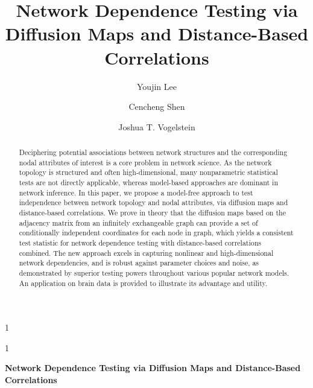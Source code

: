 \documentclass[12pt]{article}
\theoremstyle{definition}
\newcommand{\blind}{1}
\begin{document}
	
	\def\spacingset#1{\renewcommand{\baselinestretch}%
		{#1}\small\normalsize} \spacingset{1}
	
	\title{\bf Network Dependence Testing via Diffusion Maps and Distance-Based Correlations}
	\blind
	{\author[1]{Youjin Lee} %
		\author[2]{Cencheng Shen} %
		\author[2,3,4]{Joshua T. Vogelstein}
		\date{}
		\maketitle
	} \fi
	
	\blind
	{
		\bigskip
		\bigskip
		\bigskip
		\begin{center}
			{\LARGE\bf Network Dependence Testing via Diffusion Maps and Distance-Based Correlations}
		\end{center}
		\medskip
	} \fi
	
	\begin{abstract}
		Deciphering potential associations between network structures and the corresponding nodal attributes of interest is a core problem in network science. As the network topology is structured and often high-dimensional, many nonparametric statistical tests are not directly applicable, whereas model-based approaches are dominant in network inference. In this paper, we propose a model-free approach to test independence between network topology and nodal attributes, via diffusion maps and distance-based correlations. We prove in theory that the diffusion maps based on the adjacency matrix from an infinitely exchangeable graph can provide a set of conditionally independent coordinates for each node in graph, which yields a consistent test statistic for network dependence testing with distance-based correlations combined. The new approach excels in capturing nonlinear and high-dimensional network dependencies, and is robust against parameter choices and noise, as demonstrated by superior testing powers throughout various popular network models. An application on brain data is provided to illustrate its advantage and utility.
	\end{abstract}
	
\end{document}
